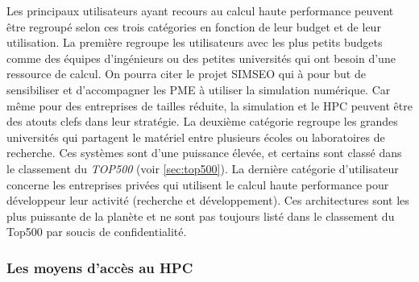         Les principaux utilisateurs ayant recours au calcul haute performance peuvent être regroupé selon ces trois catégories en fonction de leur budget et de leur utilisation. La première regroupe les utilisateurs avec les plus petits budgets comme des équipes d'ingénieurs ou des petites universités qui ont besoin d'une ressource de calcul. On pourra citer le projet SIMSEO \cite{Saguez2016} qui à pour but de sensibiliser et d'accompagner les PME à utiliser la simulation numérique. Car même pour des entreprises de tailles réduite, la simulation et le HPC peuvent être des atouts clefs dans leur stratégie.
        La deuxième catégorie regroupe les grandes universités qui partagent le matériel entre plusieurs écoles ou laboratoires de recherche. Ces systèmes sont d'une puissance élevée, et certains sont classé dans le classement du \textit{TOP500} (voir \autoref{sec:top500}). La dernière catégorie d'utilisateur concerne les entreprises privées qui utilisent le calcul haute performance pour développeur leur activité (recherche et développement). Ces architectures sont les plus puissante de la planète et ne sont pas toujours listé dans le classement du Top500 par soucis de confidentialité. 
        
        
    \subsubsection{Les moyens d'accès au HPC}
    
